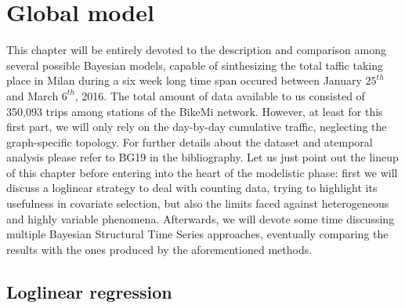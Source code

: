 \documentclass[11pt,twoside]{report}
\begin{document}
\chapter{Global model}
This chapter will be entirely devoted to the description and comparison among several possible Bayesian models, capable of sinthesizing the total taffic taking place in Milan during a six week long time span occured between January $ 25^{th} $ and March $ 6^{th} $, 2016. The total amount of data available to us consisted of 350,093 trips among stations of the BikeMi network. However, at least for this first part, we will only rely on the day-by-day cumulative traffic, neglecting the graph-specific topology. For further details about the dataset and atemporal analysis please refer to BG19 in the bibliography. Let us just point out the lineup of this chapter before entering into the heart of the modelistic phase: first we will discuss a loglinear strategy to deal with counting data, trying to highlight its usefulness in  covariate selection, but also the limits faced against heterogeneous and highly variable phenomena. Afterwards, we will devote some time discussing multiple Bayesian Structural Time Series approaches, eventually comparing the results with the ones produced by the aforementioned methods.

\section{Loglinear regression}
\end{document}
